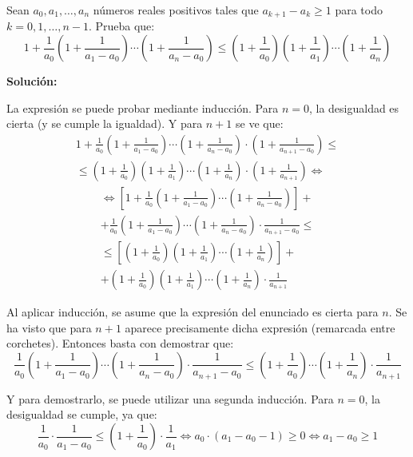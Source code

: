 \documentclass[../../main.tex]{subfiles}
\begin{document}
  \begin{shaded}
    Sean $a_0, a_1, \dots, a_n$ números reales positivos tales que $a_{k + 1} - a_k \geq 1$ para todo $k = 0, 1, \dots, n - 1$. Prueba que:
    $$
    1 + \frac{1}{a_0} \left(1 + \frac{1}{a_1 - a_0}\right) \cdots \left(1 + \frac{1}{a_n - a_0}\right) \leq \left(1 + \frac{1}{a_0}\right) \left(1 + \frac{1}{a_1}\right) \cdots \left(1 + \frac{1}{a_n}\right)
    $$
  \end{shaded}

  \textbf{Solución:}

  La expresión se puede probar mediante inducción. Para $n = 0$, la desigualdad es cierta (y se cumple la igualdad). Y para $n + 1$ se ve que:
  \begin{multline*}
  1 + \frac{1}{a_0} \left(1 + \frac{1}{a_1 - a_0}\right) \cdots \left(1 + \frac{1}{a_n - a_0}\right) \cdot \left(1 + \frac{1}{a_{n + 1} - a_0}\right) \leq \\ \leq \left(1 + \frac{1}{a_0}\right) \left(1 + \frac{1}{a_1}\right) \cdots \left(1 + \frac{1}{a_n}\right) \cdot \left(1 + \frac{1}{a_{n + 1}}\right) \iff
  \end{multline*}
  \begin{multline*}
  \iff \left[ 1 + \frac{1}{a_0} \left(1 + \frac{1}{a_1 - a_0}\right) \cdots \left(1 + \frac{1}{a_n - a_0}\right) \right] + \\ + \frac{1}{a_0} \left(1 + \frac{1}{a_1 - a_0}\right) \cdots \left(1 + \frac{1}{a_n - a_0}\right) \cdot \frac{1}{a_{n + 1} - a_0} \leq \\ \leq \left[ \left(1 + \frac{1}{a_0}\right) \left(1 + \frac{1}{a_1}\right) \cdots \left(1 + \frac{1}{a_n}\right) \right] + \\ + \left(1 + \frac{1}{a_0}\right) \left(1 + \frac{1}{a_1}\right) \cdots \left(1 + \frac{1}{a_n}\right) \cdot \frac{1}{a_{n + 1}}
  \end{multline*}

  Al aplicar inducción, se asume que la expresión del enunciado es cierta para $n$. Se ha visto que para $n + 1$ aparece precisamente dicha expresión (remarcada entre corchetes). Entonces basta con demostrar que:
  $$
  \frac{1}{a_0} \left(1 + \frac{1}{a_1 - a_0}\right) \cdots \left(1 + \frac{1}{a_n - a_0}\right) \cdot \frac{1}{a_{n + 1} - a_0} \leq \left(1 + \frac{1}{a_0}\right) \cdots \left(1 + \frac{1}{a_n}\right) \cdot \frac{1}{a_{n + 1}}
  $$

  Y para demostrarlo, se puede utilizar una segunda inducción. Para $n = 0$, la desigualdad se cumple, ya que:
  $$
  \frac{1}{a_0} \cdot \frac{1}{a_1 - a_0} \leq \left(1 + \frac{1}{a_0}\right) \cdot \frac{1}{a_1} \iff a_0 \cdot (a_1 - a_0 - 1) \geq 0 \iff a_1 - a_0 \geq 1
  $$
\end{document}
